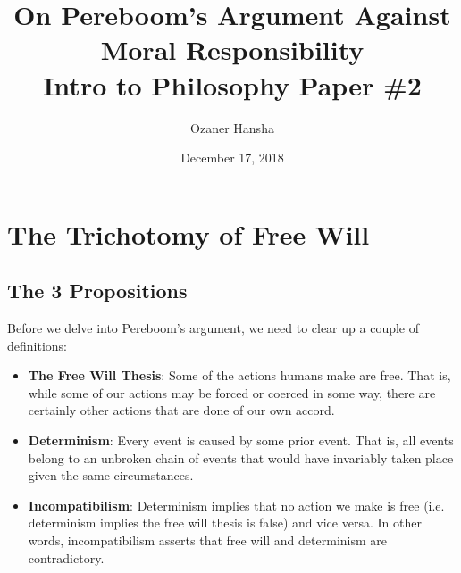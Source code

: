 \documentclass{article}
\begin{document}
\title{%
  On Pereboom's Argument Against Moral Responsibility \\
  \large Intro to Philosophy Paper \#2}
\author{Ozaner Hansha}
\date{December 17, 2018}
\maketitle


\section{The Trichotomy of Free Will}
\subsection{The 3 Propositions}
Before we delve into Pereboom's argument, we need to clear up a couple of definitions:
\begin{itemize}
  \item \textbf{The Free Will Thesis}: Some of the actions humans make are free. That is, while some of our actions may be forced or coerced in some way, there are certainly other actions that are done of our own accord.
  \item \textbf{Determinism}: Every event is caused by some prior event. That is, all events belong to an unbroken chain of events that would have invariably taken place given the same circumstances.
  \item \textbf{Incompatibilism}: Determinism implies that no action we make is free (i.e. determinism implies the free will thesis is false) and vice versa. In other words, incompatibilism asserts that free will and determinism are contradictory.
\end{itemize}
\end{document}
